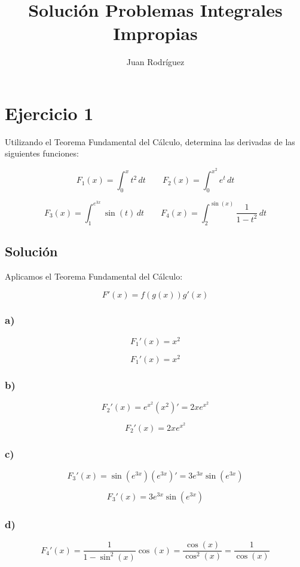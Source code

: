 \documentclass[fleqn]{article}
\title{Solución Problemas Integrales Impropias}
\author{Juan Rodríguez}
\begin{document}
\maketitle
\section{Ejercicio 1}
	Utilizando el Teorema Fundamental del Cálculo, determina las derivadas de las siguientes funciones:

	\[
	F_1(x)=\int_0^x t^2\,dt
	\qquad
	F_2(x)=\int_0^{x^2} e^t\,dt
	\]

	\[
	F_3(x)=\int_1^{e^{3x}}\sin(t)\,dt
	\qquad
	F_4(x)=\int_2^{\sin(x)}\frac{1}{1-t^2}\,dt
	\]

	\subsection{Solución}

	Aplicamos el Teorema Fundamental del Cálculo:

	\[
	F'(x)=f(g(x))g'(x)
	\]

	\subsubsection*{a)}

	\[
	F_1'(x)
	=
	x^2
	\]

	\[
	\boxed{F_1'(x)=x^2}
	\]

	\subsubsection*{b)}

	\[
	F_2'(x)
	=
	e^{x^2}(x^2)'
	=
	2xe^{x^2}
	\]

	\[
	\boxed{F_2'(x)=2xe^{x^2}}
	\]

	\subsubsection*{c)}

	\[
	F_3'(x)
	=
	\sin(e^{3x})(e^{3x})'
	=
	3e^{3x}\sin(e^{3x})
	\]

	\[
	\boxed{F_3'(x)=3e^{3x}\sin(e^{3x})}
	\]

	\subsubsection*{d)}
	\[
	F_4'(x)
	=
	\frac{1}{1-\sin^2(x)}\cos(x)
	=
	\frac{\cos(x)}{\cos^2(x)}
	=
	\frac{1}{\cos(x)}
	\]
\end{document}
